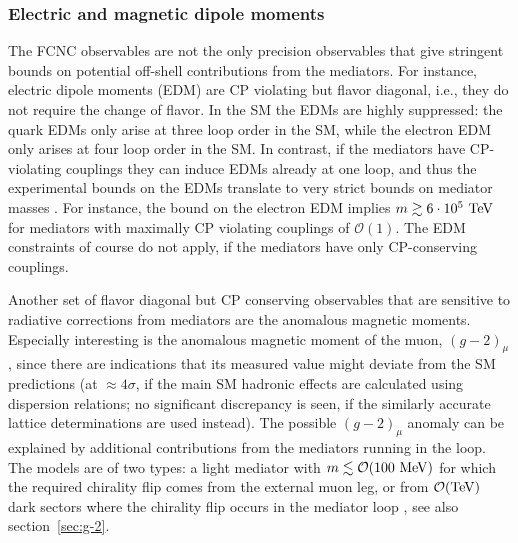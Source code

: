 \subsubsection{Electric and magnetic dipole moments} 
The FCNC observables are not the only precision observables that give stringent bounds on potential off-shell contributions from the mediators. For instance,  electric dipole moments (EDM) are CP violating but flavor diagonal, i.e., they do not require the change of flavor. In the SM the EDMs are highly suppressed: the quark EDMs only arise at three loop order in the SM, while the electron EDM only arises at four loop order in the SM. In contrast, if the mediators have CP-violating couplings they can induce EDMs already at one loop, and thus the experimental bounds on the EDMs translate to very strict bounds on mediator masses \cite{EDMs}. For instance, the bound on the electron EDM implies $m\gtrsim 6\cdot 10^5{\rm~TeV}$  for mediators with maximally CP violating couplings of ${\mathcal O}(1)$. The EDM constraints of course do not apply, if the mediators have only CP-conserving couplings. 

Another set of flavor diagonal but CP conserving observables that are sensitive to radiative corrections from mediators are the anomalous magnetic moments. Especially interesting is the anomalous magnetic moment of the muon, $(g-2)_\mu$, 
since there are indications that its measured value might deviate from the SM predictions
(at $\approx 4\sigma$, if the main SM hadronic effects are calculated using dispersion relations;
no significant discrepancy is seen,  if the similarly accurate lattice determinations are used instead).
The possible $(g-2)_\mu$ anomaly can be explained by additional contributions from the mediators running in the loop. The models are of two types: a light mediator with $m \lesssim {\mathcal O}(100\ {\rm MeV})$ for which the required chirality flip comes from the external muon leg, or from ${\mathcal O}({\rm TeV})$ dark sectors where the chirality flip occurs in the mediator loop \cite{g-2:muon:anomaly:new:physics}, see also section~\ref{sec:g-2}.
